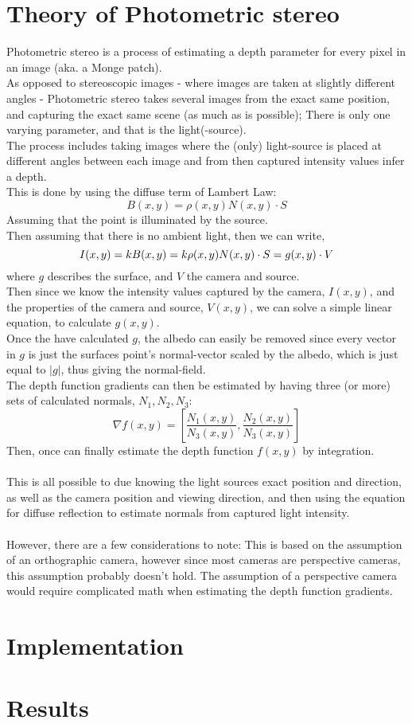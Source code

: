 \documentclass[12pt,a4paper,oneside,final]{article}
\begin{document}
\section{Theory of Photometric stereo}
Photometric stereo is a process of estimating a depth parameter for every pixel in an image (aka. a Monge patch).\\
As opposed to stereoscopic images - where images are taken at slightly different angles - Photometric stereo takes several images from the exact same position, and capturing the exact same scene (as much as is possible); There is only one varying parameter, and that is the light(-source).\\
The process includes taking images where the (only) light-source is placed at different angles between each image and from then captured intensity values infer a depth.\\
This is done by using the diffuse term of Lambert Law:
\begin{equation}
B(x,y) = \rho(x, y)N(x, y) \cdot S
\end{equation}
Assuming that the point is illuminated by the source.\\
Then assuming that there is no ambient light, then we can write,
\begin{equation}
I(x, y) = kB(x,y) = k\rho(x, y)N(x, y) \cdot S\\
= g(x, y) \cdot V
\end{equation}
where $g$ describes the surface, and $V$ the camera and source.\\
Then since we know the intensity values captured by the camera, $I(x,y)$, and the properties of the camera and source, $V(x,y)$, we can solve a simple linear equation, to calculate $g(x, y)$.\\
Once the have calculated $g$, the albedo can easily be removed since every vector in $g$ is just the surfaces point's normal-vector scaled by the albedo, which is just equal to $|g|$, thus giving the normal-field.\\
The depth function gradients can then be estimated by having three (or more) sets of calculated normals, $N_1, N_2, N_3$:
\begin{equation}
\nabla f(x, y) = [\frac{N_1(x, y)}{N_3(x, y)}, \frac{N_2(x, y)}{N_3(x, y)}]
\end{equation}
Then, once can finally estimate the depth function $f(x, y)$ by integration.\\
\\
This is all possible to due knowing the light sources exact position and direction, as well as the camera position and viewing direction, and then using the equation for diffuse reflection to estimate normals from captured light intensity.\\
\\
However, there are a few considerations to note: This is based on the assumption of an orthographic camera, however since most cameras are perspective cameras, this assumption probably doesn't hold. The assumption of a perspective camera would require complicated math when estimating the depth function gradients.

\section{Implementation}

\section{Results}
\end{document}
